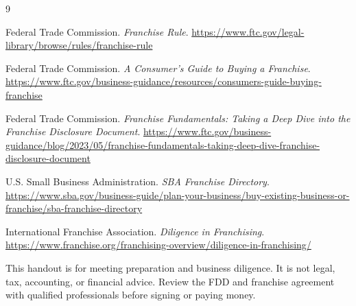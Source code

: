 \documentclass[11pt]{article}
\begin{document}
\renewcommand{\refname}{\color{accent}References}
\begin{thebibliography}{9}

Federal Trade Commission.
\textit{Franchise Rule}.
\url{https://www.ftc.gov/legal-library/browse/rules/franchise-rule}

Federal Trade Commission.
\textit{A Consumer's Guide to Buying a Franchise}.
\url{https://www.ftc.gov/business-guidance/resources/consumers-guide-buying-franchise}

Federal Trade Commission.
\textit{Franchise Fundamentals: Taking a Deep Dive into the Franchise Disclosure Document}.
\url{https://www.ftc.gov/business-guidance/blog/2023/05/franchise-fundamentals-taking-deep-dive-franchise-disclosure-document}

U.S. Small Business Administration.
\textit{SBA Franchise Directory}.
\url{https://www.sba.gov/business-guide/plan-your-business/buy-existing-business-or-franchise/sba-franchise-directory}

International Franchise Association.
\textit{Diligence in Franchising}.
\url{https://www.franchise.org/franchising-overview/diligence-in-franchising/}

\end{thebibliography}

\vfill
\noindent\textcolor{midgray}{\small This handout is for meeting preparation and business diligence. It is not legal, tax, accounting, or financial advice. Review the FDD and franchise agreement with qualified professionals before signing or paying money.}
\end{document}
